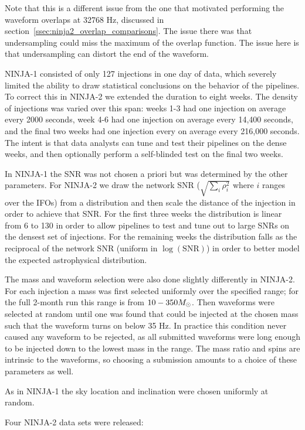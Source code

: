 Note that this is a different issue from the one that motivated
performing the waveform overlaps at 32768 Hz, discussed in
section~\ref{ssec:ninja2_overlap_comparisons}.  The issue there was
that undersampling could miss the maximum of the overlap function.
The issue here is that undersampling can distort the end of the
waveform.

NINJA-1 consisted of only 127 injections in one day of data, which
severely limited the ability to draw statistical conclusions on the
behavior of the pipelines.  To correct this in NINJA-2 we extended the
duration to eight weeks.  The density of injections was varied over
this span:  weeks 1-3 had one injection on average every 2000 seconds,
week 4-6 had one injection on average every 14,400 seconds, and the
final two weeks had one injection every on average every 216,000
seconds.  The intent is that data analysts can tune and test their
pipelines on the dense weeks, and then optionally perform a
self-blinded test on the final two weeks.

In NINJA-1 the SNR was not chosen a priori but was determined by the
other parameters.  For NINJA-2 we draw the network SNR ($\sqrt{\sum_i
\rho_i^2}$ where $i$ ranges over the IFOs) from a distribution and
then scale the distance of the injection in order to achieve that SNR.
For the first three weeks the distribution is linear from 6 to 130 in
order to allow pipelines to test and tune out to large SNRs on the
densest set of injections.  For the remaining weeks the distribution
falls as the reciprocal of the network SNR (uniform in
$\log(\mathrm{SNR})$) in order to better model the expected
astrophysical distribution.

The mass and waveform selection were also done slightly differently in
NINJA-2.  For each injection a mass was first selected uniformly over
the specified range; for the full 2-month run this range is from
$10-350 M_\odot$.  Then waveforms were selected at random until one was
found that could be injected at the chosen mass such that the waveform
turns on below 35 Hz.  In practice this condition never caused any
waveform to be rejected, as all submitted waveforms were long enough
to be injected down to the lowest mass in the range.  The mass ratio
and spins are intrinsic to the waveforms, so choosing a submission
amounts to a choice of these parameters as well. 

As in NINJA-1 the sky location and inclination were chosen uniformly
at random.

Four NINJA-2 data sets were released:


